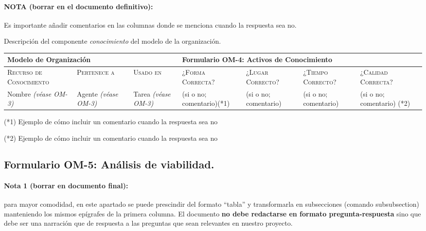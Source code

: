 \documentclass[12pt,a4paper,twoside,spanish]{article}      %
\begin{document}
\paragraph{NOTA (borrar en el documento definitivo):} Es importante añadir comentarios en las columnas donde se menciona cuando la respuesta sea no.

Descripción del componente \textit{conocimiento} del modelo de la organización.

\begin{table}[H]
\scriptsize
\begin{tabularx}{\textwidth}{|p{1.3cm}|p{1.3cm}|p{1.3cm}|X|X|X|X|} \hline
\multicolumn{3}{|l}{\textbf{Modelo de Organización}} & \multicolumn{4}{|l|}{\textbf{Formulario OM-4: Activos de Conocimiento}} \\ \hline\hline
\textsc{Recurso de Conocimiento} & \textsc{Pertenece a} &  \textsc{Usado en} &  \textsc{¿Forma
Correcta?} & \textsc{¿Lugar Correcto?} & \textsc{¿Tiempo Correcto?} & \textsc{¿Calidad Correcta?}\\ \hline
Nombre \emph{(\textit{véase} OM-3)} & Agente \emph{(\textit{véase} OM-3)}& Tarea \emph{(\textit{véase} OM-3)}& (si o no; comentario)(*1)&
(si o no; comentario)& (si o no; comentario) & (si o no; comentario) (*2)\\ \hline
\end{tabularx}

  \label{tab.OM4}
\end{table}

\noindent (*1) Ejemplo de cómo incluir un comentario cuando la respuesta sea no

\noindent (*2) Ejemplo de cómo incluir un comentario cuando la respuesta sea no

\pagebreak
\subsection{Formulario OM-5: Análisis de viabilidad.}

\paragraph{Nota 1 (borrar en documento final):} para mayor comodidad, en este apartado se puede prescindir del formato ``tabla'' y transformarla en subsecciones (comando subsubsection)  manteniendo los mismos epígrafes de la primera columna. El documento \textbf{no debe redactarse en formato pregunta-respuesta} sino que debe ser una narración que de respuesta a las preguntas que sean relevantes en nuestro proyecto.
\end{document}
